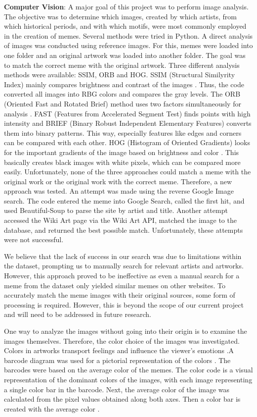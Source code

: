 \documentclass[11pt,a4paper]{article}
\begin{document}
 \textbf{Computer Vision}: A major goal of this project was to perform image analysis. The objective was to determine which images, created by which artists, from which historical periods, and with which motifs, were most commonly employed in the creation of memes. Several methods were tried in Python. A direct analysis of images was conducted using reference images.  For this, memes were loaded into one folder and an original artwork was loaded into another folder. The goal was to match the correct meme with the original artwork. Three different analysis methods were available: SSIM, ORB and HOG. SSIM (Structural Similyrity Index) mainly compares brightness and contrast of the images \cite{Datta2020}. Thus, the code converted all images into RBG colors and compares the gray levels. The ORB (Oriented Fast and Rotated Brief) method uses two factors simultaneously for analysis \cite{Tyagi2019}. FAST (Features from Accelerated Segment Test) finds points with high intensity and BRIEF (Binary Robust Independent Elementary Features) converts them into binary patterns. This way, especially features like edges and corners can be compared with each other. HOG (Histogram of Oriented Gradients) looks for the important gradients of the image based on brightness and color \cite{Mallick2016}. This basically creates black images with white pixels, which can be compared more easily. Unfortunately, none of the three approaches could match a meme with the original work or the original work with the correct meme.
Therefore, a new approach was tested. An attempt was made using the reverse Google Image search. The code entered the meme into Google Search, called the first hit, and used Beautiful-Soup to parse the site by artist and title. Another attempt accessed the Wiki Art page via the Wiki Art API, matched the image to the database, and returned the best possible match. Unfortunately, these attempts were not successful.
\par We believe that the lack of success in our search was due to limitations within the dataset, prompting us to manually search for relevant artists and artworks. However, this approach proved to be ineffective as even a manual search for a meme from the dataset only yielded similar memes on other websites. To accurately match the meme images with their original sources, some form of processing is required. However, this is beyond the scope of our current project and will need to be addressed in future research.
\newline \par One way to analyze the images without going into their origin is to examine the images themselves. Therefore, the color choice of the images was investigated. Colors in artworks transport feelings and influence the viewer's emotions \cite{Schels2020}.A barcode diagram was used for a pictorial representation of the colors \cite{CainnD}. The barcodes were based on the average color of the memes. The color code is a visual representation of the dominant colors of the images, with each image representing a single color bar in the barcode. Next, the average color of the image was calculated from the pixel values obtained along both axes. Then a color bar is created with the average color \cite{Chen2021}.
\end{document}
